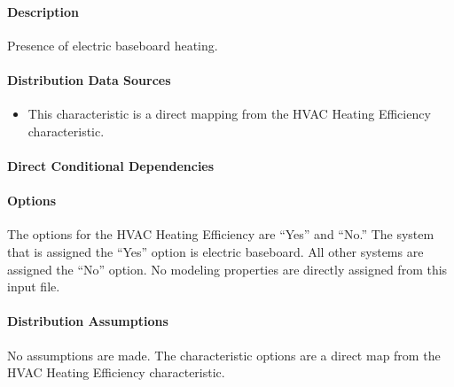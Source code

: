 \paragraph{Description}
% 
Presence of electric baseboard heating.

\paragraph{Distribution Data Sources}
% 
\begin{itemize}
    \item This characteristic is a direct mapping from the HVAC Heating Efficiency characteristic.
\end{itemize}

\paragraph{Direct Conditional Dependencies}


\paragraph{Options}
The options for the HVAC Heating Efficiency are ``Yes'' and ``No.'' The system that is assigned the ``Yes'' option is electric baseboard. All other systems are assigned the ``No'' option. No modeling properties are directly assigned from this input file.

\paragraph{Distribution Assumptions}
% 
No assumptions are made. The characteristic options are a direct map from the HVAC Heating Efficiency characteristic.
